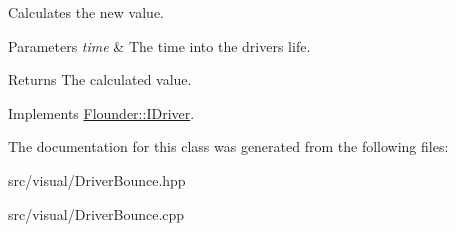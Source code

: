 Calculates the new value. 


\begin{DoxyParams}{Parameters}
{\em time} & The time into the drivers life. \\
\hline
\end{DoxyParams}
\begin{DoxyReturn}{Returns}
The calculated value. 
\end{DoxyReturn}


Implements \hyperlink{class_flounder_1_1_i_driver_a969f0c8da089f9d17129ee12b40c354a}{Flounder\+::\+I\+Driver}.



The documentation for this class was generated from the following files\+:\begin{DoxyCompactItemize}
\item 
src/visual/Driver\+Bounce.\+hpp\item 
src/visual/Driver\+Bounce.\+cpp\end{DoxyCompactItemize}
